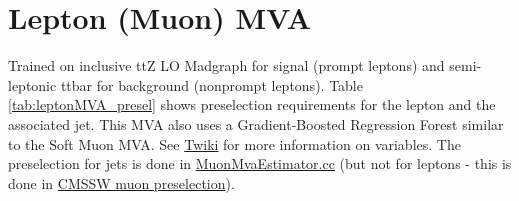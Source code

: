 \documentclass[11pt]{article}
\begin{document}
\section{Lepton (Muon) MVA}
Trained on inclusive ttZ LO Madgraph for signal (prompt leptons) and semi-leptonic ttbar for background (nonprompt leptons). Table \ref{tab:leptonMVA_presel} shows preselection requirements for the lepton and the associated jet. This MVA also uses a Gradient-Boosted Regression Forest similar to the Soft Muon MVA. See \href{https://twiki.cern.ch/twiki/bin/viewauth/CMS/LeptonMVA}{Twiki} for more information on variables. The preselection for jets is done in \href{https://github.com/cms-sw/cmssw/blob/736475d21640a0bb349922b330939464e214db8b/PhysicsTools/PatAlgos/src/MuonMvaEstimator.cc#L113}{MuonMvaEstimator.cc} (but not for leptons - this is done in \href{https://github.com/cms-sw/cmssw/blob/736475d21640a0bb349922b330939464e214db8b/PhysicsTools/PatAlgos/plugins/PATMuonProducer.cc#L752}{CMSSW muon preselection}).
\end{document}
